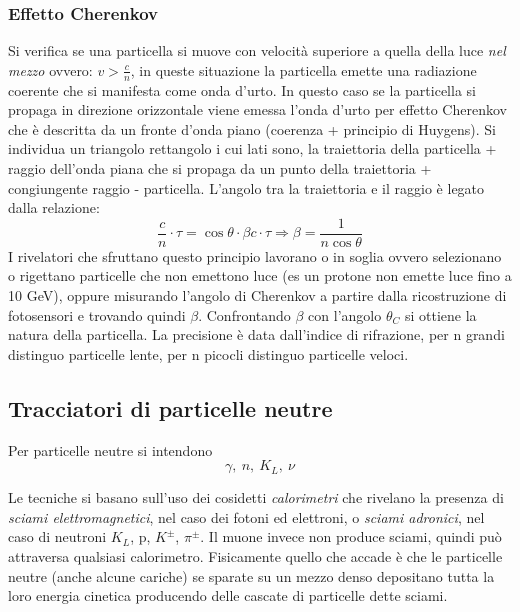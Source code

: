 \documentclass[12pt]{book}
\begin{document}
\subsubsection{Effetto Cherenkov}
Si verifica se una particella si muove con velocità superiore a quella della luce \emph{nel mezzo} ovvero: $v> \frac{c}{n}$, in queste situazione la particella emette una radiazione coerente che si manifesta come onda d'urto. In questo caso se la particella si propaga in direzione orizzontale viene emessa l'onda d'urto per effetto Cherenkov che è descritta da un fronte d'onda piano (coerenza + principio di Huygens). Si individua un triangolo rettangolo i cui lati sono, la traiettoria della particella + raggio dell'onda piana che si propaga da un punto della traiettoria + congiungente raggio - particella. L'angolo tra la traiettoria e il raggio è legato dalla relazione:
\begin{equation}
	\frac{c}{n} \cdot \tau  = \cos \theta \cdot \beta c \cdot \tau \Longrightarrow \beta = \frac{1}{n \cos \theta}
\end{equation}
I rivelatori che sfruttano questo principio lavorano o in soglia ovvero selezionano o rigettano particelle che non emettono luce (es un protone non emette luce fino a 10 GeV), oppure misurando l'angolo di Cherenkov a partire dalla ricostruzione di fotosensori e trovando quindi $\beta$. Confrontando $\beta$ con l'angolo $\theta_C$ si ottiene la natura della particella. La precisione è data dall'indice di rifrazione, per n grandi distinguo particelle lente, per n picocli distinguo particelle veloci.

\newpage
\subsection{Tracciatori di particelle neutre}
Per particelle neutre si intendono
\begin{equation}
	\gamma,\ n, \ K_L, \ \nu
\end{equation}


Le tecniche si basano sull'uso dei cosidetti \emph{calorimetri} che rivelano la presenza di \emph{sciami elettromagnetici}, nel caso dei fotoni ed elettroni, o \emph{sciami adronici}, nel caso di neutroni $K_L$, p, $K^\pm$, $\pi^\pm$. Il muone invece non produce sciami, quindi può attraversa qualsiasi calorimetro. Fisicamente quello che accade è che le particelle neutre (anche alcune cariche) se sparate su un mezzo denso depositano tutta la loro energia cinetica producendo delle cascate di particelle dette sciami.
\end{document}
